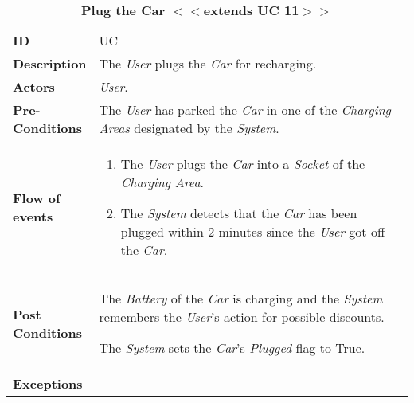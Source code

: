 \begin{longtable}{|p{0.2\linewidth} p{0.8\linewidth}|}
	\captionsetup{labelformat=empty} %
	\caption{\textbf{Plug the Car $<<$extends UC 11$>>$}} %
	\label{UC_PlugCar}%
	\\ \hline %
	
	\textbf{ID} & UC\theUseCaseIdCounter \\ \hline
	\textbf{Description} & The \emph{User} plugs the \emph{Car} for recharging. \\ \hline
	\textbf{Actors} & \emph{User}.\\ \hline
	\textbf{Pre-Conditions} & The \emph{User} has parked the \emph{Car} in one of the \emph{Charging Areas} designated by the \emph{System}. \\ \hline
	\textbf{Flow of events} & 
	\begin{enumerate}
		\item The \emph{User} plugs the \emph{Car} into a \emph{Socket} of the \emph{Charging Area}. 
		\item The \emph{System} detects that the \emph{Car} has been plugged within 2 minutes since the \emph{User} got off the \emph{Car}.
	\end{enumerate}	 \\ \hline
	\textbf{Post Conditions} & The \emph{Battery} of the \emph{Car} is charging and the \emph{System} remembers the \emph{User}'s action for possible discounts.
	
The \emph{System} sets the \emph{Car}'s \emph{Plugged} flag to True.
	\\ \hline
	\textbf{Exceptions} & \\ \hline
\end{longtable}


